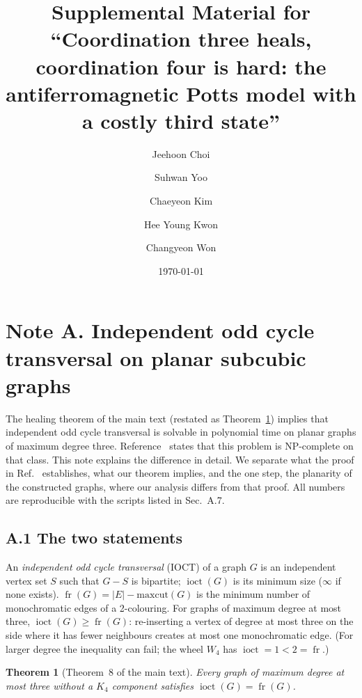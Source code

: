 \documentclass[aps,pre,onecolumn,nofootinbib]{revtex4-2}
\newtheorem{theorem}{Theorem}
\theoremstyle{remark}
\newcommand{\fr}{\operatorname{fr}}
\newcommand{\ioct}{\operatorname{ioct}}
\begin{document}
\title{Supplemental Material for ``Coordination three heals, coordination four is hard:
the antiferromagnetic Potts model with a costly third state''}
\author{Jeehoon Choi}
\author{Suhwan Yoo}
\author{Chaeyeon Kim}
\author{Hee Young Kwon}
\author{Changyeon Won}
\date{\today}
\maketitle

\section*{Note A. Independent odd cycle transversal on planar subcubic graphs}

The healing theorem of the main text (restated as Theorem~\ref{thm:S-heal}) implies that
independent odd cycle transversal is solvable in polynomial time on planar graphs of maximum
degree three. Reference~\cite{Johnson2025} states that this problem is NP-complete on that class.
This note explains the difference in detail. We separate what the proof in Ref.~\cite{Johnson2025}
establishes, what our theorem implies, and the one step, the planarity of the constructed graphs,
where our analysis differs from that proof. All numbers are reproducible with the scripts listed
in Sec.~A.7.

\subsection*{A.1 The two statements}

An \emph{independent odd cycle transversal} (IOCT) of a graph $G$ is an independent vertex set
$S$ such that $G-S$ is bipartite; $\ioct(G)$ is its minimum size ($\infty$ if none exists).
$\fr(G)=|E|-\mathrm{maxcut}(G)$ is the minimum number of monochromatic edges of a 2-colouring.
For graphs of maximum degree at most three, $\ioct(G)\ge\fr(G)$: re-inserting a vertex of degree at
most three on the side where it has fewer neighbours creates at most one monochromatic edge. (For
larger degree the inequality can fail; the wheel $W_4$ has $\ioct=1<2=\fr$.)

\begin{theorem}[Theorem~8 of the main text]\label{thm:S-heal}
Every graph of maximum degree at most three without a $K_4$ component satisfies $\ioct(G)=\fr(G)$.
\end{theorem}
\end{document}
